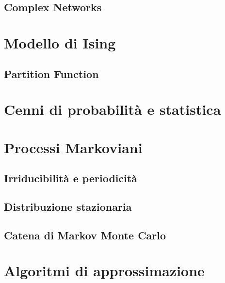 \subsection{Complex Networks}


\section{Modello di Ising}
\subsection{Partition Function}

\section{Cenni di probabilità e statistica}

\section{Processi Markoviani}
\subsection{Irriducibilità e periodicità}
\subsection{Distribuzione stazionaria}
\subsection{Catena di Markov Monte Carlo}

\section{Algoritmi di approssimazione}